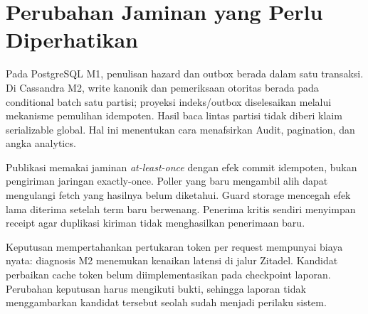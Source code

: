 \section{Perubahan Jaminan yang Perlu Diperhatikan}
Pada PostgreSQL M1, penulisan hazard dan outbox berada dalam satu transaksi. Di Cassandra M2, write kanonik dan pemeriksaan otoritas berada pada conditional batch satu partisi; proyeksi indeks/outbox diselesaikan melalui mekanisme pemulihan idempoten. Hasil baca lintas partisi tidak diberi klaim serializable global. Hal ini menentukan cara menafsirkan Audit, pagination, dan angka analytics.

Publikasi memakai jaminan \emph{at-least-once} dengan efek commit idempoten, bukan pengiriman jaringan exactly-once. Poller yang baru mengambil alih dapat mengulangi fetch yang hasilnya belum diketahui. Guard storage mencegah efek lama diterima setelah term baru berwenang. Penerima kritis sendiri menyimpan receipt agar duplikasi kiriman tidak menghasilkan penerimaan baru.

Keputusan mempertahankan pertukaran token per request mempunyai biaya nyata: diagnosis M2 menemukan kenaikan latensi di jalur Zitadel. Kandidat perbaikan cache token belum diimplementasikan pada checkpoint laporan. Perubahan keputusan harus mengikuti bukti, sehingga laporan tidak menggambarkan kandidat tersebut seolah sudah menjadi perilaku sistem.
